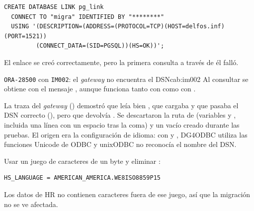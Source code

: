 \begin{lstlisting}[style=sql]
CREATE DATABASE LINK pg_link
  CONNECT TO "migra" IDENTIFIED BY "********"
  USING '(DESCRIPTION=(ADDRESS=(PROTOCOL=TCP)(HOST=delfos.inf)(PORT=1521))
         (CONNECT_DATA=(SID=PGSQL))(HS=OK))';
\end{lstlisting}

El enlace se creó correctamente, pero la primera consulta a través de él falló.

\begin{cabezazo}{\texttt{ORA-28500} con \texttt{IM002}: el \textit{gateway} no encuentra el DSN}{cab:im002}
\problema Al consultar  se obtiene
 con el mensaje
,
aunque  funciona tanto con  como con
.

\causa La traza del \textit{gateway} ()
demostró que leía bien , que cargaba  y
que pasaba el DSN correcto (), pero que
 devolvía . Se descartaron la ruta de
 (variables  y , incluida una
línea  con un espacio tras la coma) y un  vacío
creado durante las pruebas. El origen era la configuración de idioma:
con  y ,
DG4ODBC utiliza las funciones Unicode de ODBC y unixODBC no reconocía el
nombre del DSN.

\solucion Usar un juego de caracteres de un byte y eliminar
:
\begin{lstlisting}
HS_LANGUAGE = AMERICAN_AMERICA.WE8ISO8859P15
\end{lstlisting}
Los datos de HR no contienen caracteres fuera de ese juego, así que la
migración no se ve afectada.
\end{cabezazo}


